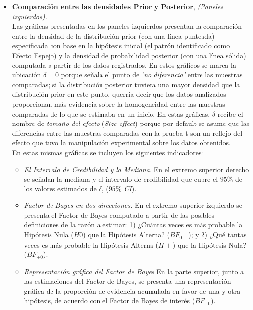 \begin{itemize}
\item \textbf{Comparación entre las densidades Prior y Posterior}, \textit{(Paneles izquierdos).}\\

Las gráficas presentadas en los paneles izquierdos presentan la comparación entre la densidad de la distribución prior (con una línea punteada) especificada con base en la hipótesis inicial (el patrón identificado como Efecto Espejo) y la densidad de probabilidad posterior (con una línea sólida) computada a partir de los datos registrados. En estos gráficos se marca la ubicación $\delta = 0$ porque señala el punto de \textit{'no diferencia'} entre las muestras comparadas; si la distribución posterior tuviera una mayor densidad que la distribución prior en este punto, querría decir que los datos analizados proporcionan más evidencia sobre la homogeneidad entre las muestras comparadas de lo que se estimaba en un inicio. En estas gráficas, $\delta$ recibe el nombre de \textit{tamaño del efecto} (\textit{\textit{Size effect}}) porque por default se asume que las diferencias entre las muestras comparadas con la prueba t son un reflejo del efecto que tuvo la manipulación experimental sobre los datos obtenidos.\\ 

En estas mismas gráficas se incluyen los siguientes indicadores:\\

\begin{itemize}
	\item \textit{El Intervalo de Credibilidad y la Mediana.} En el extremo superior derecho se señalan la mediana y el intervalo de credibilidad que cubre el $95\%$ de los valores estimados de $\delta$, (\textit{$95\%$ CI}).\\

	\item \textit{Factor de Bayes en dos direcciones.} En el extremo superior izquierdo se presenta el Factor de Bayes computado a partir de las posibles definiciones de la razón a estimar: 1) ¿Cuántas veces es más probable la Hipótesis Nula ($H0$) que la Hipótesis Alterna? ($BF_{0+}$); y 2) ¿Qué tantas veces es más probable la Hipótesis Alterna ($H+$) que la Hipótesis Nula? ($BF_{+0}$).\\

	\item \textit{Representación gráfica del Factor de Bayes} En la parte superior, junto a las estimaciones del Factor de Bayes, se presenta una representación gráfica de la proporción de evidencia acumulada en favor de una y otra hipótesis, de acuerdo con el Factor de Bayes de interés ($BF_{+0}$).\\
\end{itemize}


\end{itemize}
